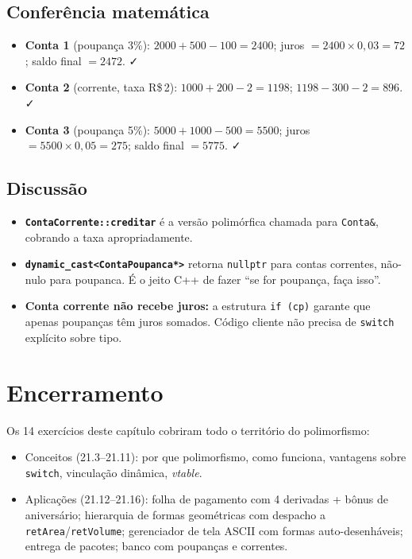 \documentclass[11pt,a4paper]{article}
\begin{document}
\subsection*{Confer\^encia matem\'atica}

\begin{itemize}[leftmargin=*,itemsep=0pt]
  \item \textbf{Conta 1} (poupan\c{c}a 3\%): $2000 + 500 - 100 = 2400$; juros $= 2400 \times 0{,}03 = 72$; saldo final $= 2472$. ✓
  \item \textbf{Conta 2} (corrente, taxa R\$\,2): $1000 + 200 - 2 = 1198$; $1198 - 300 - 2 = 896$. ✓
  \item \textbf{Conta 3} (poupan\c{c}a 5\%): $5000 + 1000 - 500 = 5500$; juros $= 5500 \times 0{,}05 = 275$; saldo final $= 5775$. ✓
\end{itemize}

\subsection*{Discuss\~ao}

\begin{itemize}[leftmargin=*]
  \item \textbf{\texttt{ContaCorrente::creditar}} \'e a vers\~ao polim\'orfica chamada para \texttt{Conta\&}, cobrando a taxa apropriadamente.
  \item \textbf{\texttt{dynamic\_cast<ContaPoupanca*>}} retorna \texttt{nullptr} para contas correntes, n\~ao-nulo para poupanca. \'E o jeito C++ de fazer ``se for poupan\c{c}a, fa\c{c}a isso''.
  \item \textbf{Conta corrente n\~ao recebe juros:} a estrutura \texttt{if (cp)} garante que apenas poupan\c{c}as t\^em juros somados. C\'odigo cliente n\~ao precisa de \texttt{switch} expl\'icito sobre tipo.
\end{itemize}

\section*{Encerramento}

Os 14 exerc\'icios deste cap\'itulo cobriram todo o territ\'orio do polimorfismo:

\begin{itemize}[leftmargin=*,itemsep=0pt]
  \item Concei\-tos (21.3--21.11): por que polimorfismo, como funciona, vantagens sobre \texttt{switch}, vincula\c{c}\~ao din\^amica, \emph{vtable}.
  \item Aplica\c{c}\~oes (21.12--21.16): folha de pagamento com 4 derivadas + b\^onus de anivers\'ario; hierarquia de formas geom\'etricas com despacho a \texttt{retArea}/\texttt{retVolume}; gerenciador de tela ASCII com formas auto-desenh\'aveis; entrega de pacotes; banco com poupan\c{c}as e correntes.
\end{itemize}
\end{document}
